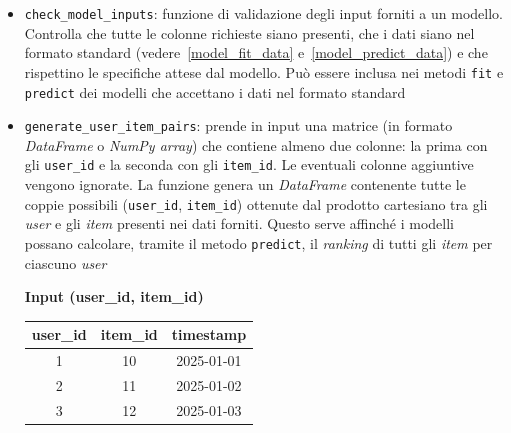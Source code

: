 \begin{itemize}
    \item \texttt{check\_model\_inputs}: funzione di validazione degli input forniti a un modello. Controlla che tutte le colonne richieste siano presenti, che i dati siano nel formato standard (vedere~\ref{model_fit_data} e~\ref{model_predict_data}) e che rispettino le specifiche attese dal modello. Può essere inclusa nei metodi \texttt{fit} e \texttt{predict} dei modelli che accettano i dati nel formato standard

    \item \texttt{generate\_user\_item\_pairs}: prende in input una matrice (in formato \textit{DataFrame} o \textit{NumPy array}) che contiene almeno due colonne: la prima con gli \texttt{user\_id} e la seconda con gli \texttt{item\_id}. Le eventuali colonne aggiuntive vengono ignorate. La funzione genera un \textit{DataFrame} contenente tutte le coppie possibili (\texttt{user\_id}, \texttt{item\_id}) ottenute dal prodotto cartesiano tra gli \textit{user} e gli \textit{item} presenti nei dati forniti. Questo serve affinché i modelli possano calcolare, tramite il metodo \texttt{predict}, il \textit{ranking} di tutti gli \textit{item} per ciascuno \textit{user}
    \begin{table}[H]
        \centering
        \begin{minipage}{\textwidth}
            \centering
            \textbf{Input (user\_id, item\_id)}\\[0.5em]
            \begin{tabular}{|c|c|c|}
            \hline
            \textbf{user\_id} & \textbf{item\_id} & \textbf{timestamp} \\
            \hline
            1 & 10 & 2025-01-01 \\
            2 & 11 & 2025-01-02 \\
            3 & 12 & 2025-01-03 \\
            \hline
            \end{tabular}
        \end{minipage}

        \vspace{1em} %


\end{table}
\end{itemize}
